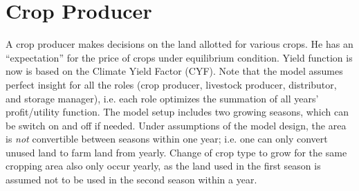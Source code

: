 \documentclass[one column,a4paper]{article}
\title{\mytitle}
\date{}
\author{Sriram Sankaranarayanan\and Ying Zhang\and Sauleh Siddiqui}
\theoremstyle{definition}
\numberwithin{equation}			{section}
\begin{document}
\maketitle
\section{Crop Producer} %
A crop producer makes decisions on the land allotted for various crops. He has an ``expectation'' for the price of crops under equilibrium condition. Yield function is now is based on the Climate Yield Factor (CYF). Note that the model assumes perfect insight for all the roles (crop producer, livestock producer, distributor, and storage manager), i.e. each role optimizes the summation of all years' profit/utility function. The model setup includes two growing seasons, which can be switch on and off if needed. Under assumptions of the model design, the area is \textit{not} convertible between seasons within one year; i.e. one can only convert unused land to farm land from yearly. Change of crop type to grow for the same cropping area also only occur yearly, as the land used in the first season is assumed not to be used in the second season within a year.   
\end{document}
